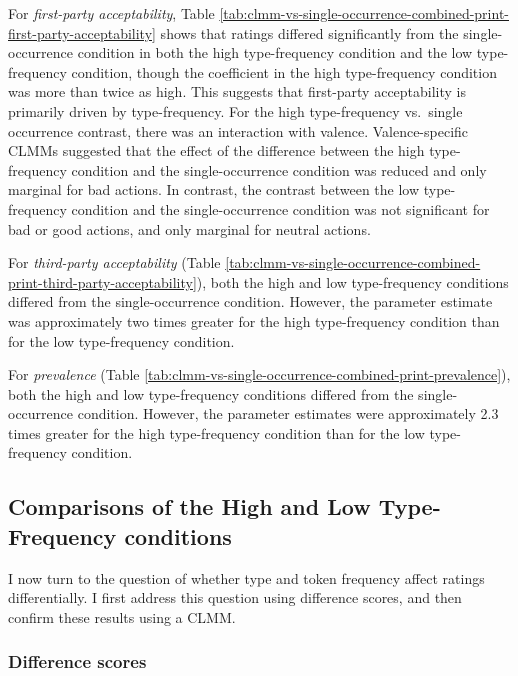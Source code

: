 \documentclass[
]{article}
\begin{document}
For \emph{first-party acceptability}, Table \ref{tab:clmm-vs-single-occurrence-combined-print-first-party-acceptability} shows that ratings differed significantly from the single-occurrence condition in both the high type-frequency condition and the low type-frequency condition, though the coefficient in the high type-frequency condition was more than twice as high. This suggests that first-party acceptability is primarily driven by type-frequency. For the high type-frequency vs.~single occurrence contrast, there was an interaction with valence. Valence-specific CLMMs suggested that the effect of the difference between the high type-frequency condition and the single-occurrence condition was reduced and only marginal for bad actions. In contrast, the contrast between the low type-frequency condition and the single-occurrence condition was not significant for bad or good actions, and only marginal for neutral actions.

For \emph{third-party acceptability} (Table \ref{tab:clmm-vs-single-occurrence-combined-print-third-party-acceptability}), both the high and low type-frequency conditions differed from the single-occurrence condition. However, the parameter estimate was approximately two times greater for the high type-frequency condition than for the low type-frequency condition.

For \emph{prevalence} (Table \ref{tab:clmm-vs-single-occurrence-combined-print-prevalence}), both the high and low type-frequency conditions differed from the single-occurrence condition. However, the parameter estimates were approximately 2.3 times greater for the high type-frequency condition than for the low type-frequency condition.

\subsection{Comparisons of the High and Low Type-Frequency conditions}\label{comparisons-of-the-high-and-low-type-frequency-conditions-3}

I now turn to the question of whether type and token frequency affect ratings differentially. I first address this question using difference scores, and then confirm these results using a CLMM.

\subsubsection{Difference scores}\label{difference-scores-3}
\end{document}
